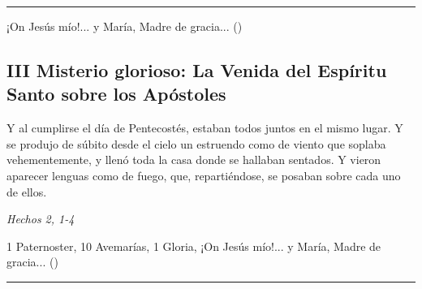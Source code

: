\documentclass[./rosary.tex]{subfiles}
\begin{document}
\rule{\textwidth}{0.5pt}
¡On Jesús mío!... y María, Madre de gracia... ()

\subsection*{III Misterio glorioso: La Venida del Espíritu Santo sobre los Apóstoles}

Y al cumplirse el día de Pentecostés, estaban todos juntos en el mismo lugar. Y se produjo de súbito desde el cielo un estruendo como de viento que soplaba vehementemente,
y llenó toda la casa donde se hallaban sentados. Y vieron aparecer lenguas como de fuego, que, repartiéndose, se posaban sobre cada uno de ellos.

\begin{flushright}
    \emph{Hechos 2, 1-4}
\end{flushright}

1 Paternoster, 10 Avemarías, 1 Gloria, ¡On Jesús mío!... y María, Madre de gracia... ()

\rule{\textwidth}{0.5pt}
\end{document}
